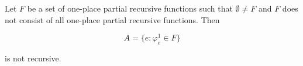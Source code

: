 Let $F$ be a set of one-place partial recursive functions such that $\emptyset \neq F$ and $F$ does not consist of all one-place partial recursive functions. Then

$$A = \{e : \varphi^1_e \in F\}$$

is not recursive.
